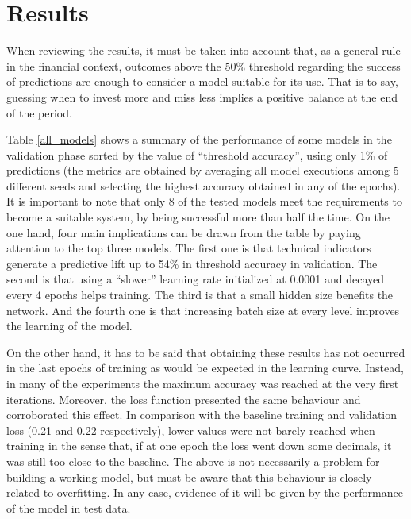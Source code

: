 \documentclass[10pt,twocolumn,letterpaper]{article}
\begin{document}
\section{Results}

When reviewing the results, it must be taken into account that, as a general rule in the financial context, outcomes above the 50\% threshold regarding the success of predictions are enough to consider a model suitable for its use. That is to say, guessing when to invest more and miss less implies a positive balance at the end of the period.

Table \ref{all_models} shows a summary of the performance of some models in the validation phase sorted by the value of “threshold accuracy”, \ie using only 1\% of predictions (the metrics are obtained by averaging all model executions among 5 different seeds and selecting the highest accuracy obtained in any of the epochs). It is important to note that only 8 of the tested models meet the requirements to become a suitable system, by being successful more than half the time. On the one hand, four main implications can be drawn from the table by paying attention to the top three models. The first one is that technical indicators generate a predictive lift up to 54\% in threshold accuracy in validation. The second is that using a “slower” learning rate initialized at 0.0001 and decayed every 4 epochs helps training. The third is that a small hidden size benefits the network. And the fourth one is that increasing batch size at every level improves the learning of the model.

On the other hand, it has to be said that obtaining these results has not occurred in the last epochs of training as would be expected in the learning curve. Instead, in many of the experiments the maximum accuracy was reached at the very first iterations. Moreover, the loss function presented the same behaviour and corroborated this effect. In comparison with the baseline training and validation loss (0.21 and 0.22 respectively), lower values were not barely reached when training in the sense that, if at one epoch the loss went down some decimals, it was still too close to the baseline. The above is not necessarily a problem for building a working model, but must be aware that this behaviour is closely related to overfitting. In any case, evidence of it will be given by the performance of the model in test data. 
\end{document}
